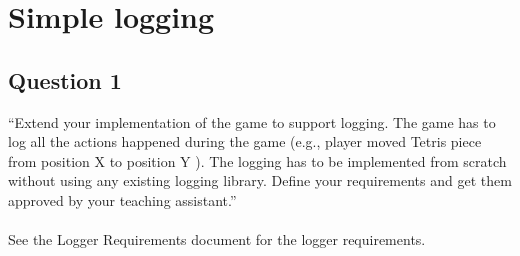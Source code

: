 \chapter{Simple logging}

\section{Question 1}

``Extend your implementation of the game to support logging. The game has to log all the actions
happened during the game (e.g., player moved Tetris piece from position X to position Y ). The
logging has to be implemented from scratch without using any existing logging library. Define your
requirements and get them approved by your teaching assistant.''
\\\\
See the Logger Requirements document for the logger requirements.